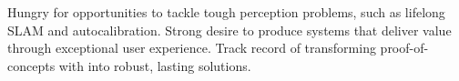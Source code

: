 

\begin{cvparagraph}

Hungry for opportunities to tackle tough perception problems, such as lifelong
SLAM and autocalibration. Strong desire to produce systems that deliver
value through exceptional user experience. Track record of transforming
proof-of-concepts with into robust, lasting solutions.
\end{cvparagraph}
